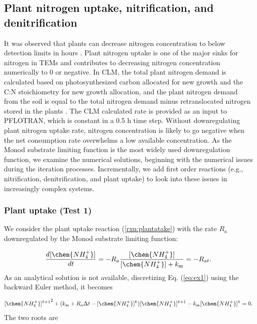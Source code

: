 \documentclass[gmd, manuscript]{copernicus}
\begin{document}
\subsection{Plant nitrogen uptake, nitrification, and denitrification}
\label{sec:test1}
It was observed that plants can decrease nitrogen concentration to below
detection limits in hours \citep{Kamer2001}. Plant nitrogen uptake is one of
the major sinks for nitrogen in TEMs and contributes to decreasing nitrogen concentration
numerically to 0 or negative. In CLM, the total plant nitrogen demand is
calculated based on photosynthesized carbon allocated for new growth and the
C:N stoichiometry for new growth allocation, and the plant nitrogen demand from
the soil is equal to the total nitrogen demand minus retranslocated nitrogen
stored in the plants  \citep{Oleson2013}. The CLM calculated rate is provided
as an input to PFLOTRAN, which is constant in a 0.5 h time step. Without
downregulating plant nitrogen uptake rate, nitrogen concentration is likely to go negative
when the net consumption rate overwhelms a low available concentration.  As the
Monod substrate limiting function is the most widely used downregulation
function, we examine the numerical solutions, beginning with the numerical
issues during the iteration processes. Incrementally, we
add first order reactions (e.g., nitrification, denitrification, and plant
 uptake) to look into these issues in increasingly complex systems. 

\subsubsection{Plant  uptake (Test 1)}
We consider the plant  uptake reaction (\ref{rxn:plantatake}) with the
rate $R_a$ downregulated by the Monod substrate limiting function:

\begin{equation}
\frac{d[\chem{NH_4^+}]}{dt} =- R_a \frac{[\chem{NH_4^+}]}{[\chem{NH_4^+}]+k_\text{m}} = -R_{at}.
\label{eq:ex1}
\end{equation}
As an analytical solution is not available, discretizing Eq. (\ref{eq:ex1})
using the backward Euler method, it becomes

\begin{equation}
{[\chem{NH_4^+}]^{k+1}}^2+(k_\text{m} + R_a \Delta t - [\chem{NH_4^+}]^k)
[\chem{NH_4^+}]^{k+1} - k_\text{m} [\chem{NH_4^+}]^k = 0.
\end{equation}
The two roots are
\end{document}
